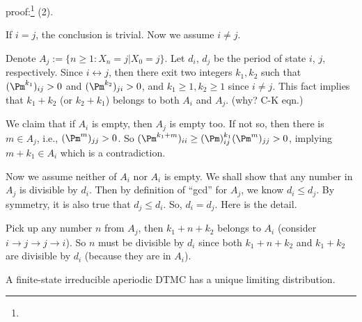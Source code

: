 \documentclass[english,10pt]{beamer}
\begin{document}
\begin{frame}\par
{\small
{proof:}\footnote{{\optional}} (2). 
\biz
\item
If $i=j$, the conclusion is trivial. Now we assume $i\neq j$.

Denote $A_j := \{n\geq 1: X_n=j | X_0=j\}$.
 Let $d_i$, $d_j$ be the period of state $i$, $j$, respectively.
 Since $i \leftrightarrow j $,
then there exit two integers $k_1, k_2$ such that $(\Pm^{k_1})_{ij}>0$
and  $(\Pm^{k_2})_{ji}>0$, and $k_1\geq 1,k_2\geq 1$ since $i\neq j$.
 This fact implies that $k_1+k_2$ (or $k_2+k_1$) belongs to both $A_i$ and $A_j$.
 (why? C-K eqn.)
 
\item  We claim  that if  $A_i$ is empty, then $A_j$ is empty too.
If not so, then there is $m\in A_j$, i.e.,   
  $ (\Pm^m)_{jj}>0$.
 So $(\Pm^{k_1+m})_{ii}\geq (\Pm)^{k_1}_{ij}(\Pm^{m})_{jj}>0$, 
 implying
 $m+k_1\in A_i$ which is a contradiction.
 \item  Now we assume neither of $A_i$ nor $A_i$ is empty.
We shall show that  any number in $A_j$   is divisible by  $d_i$.
Then by definition of ``gcd'' for $A_j$, we know $d_i\leq d_j$.  
By symmetry, it is also true that $d_j\leq d_i$. So, $d_i=d_j$. 
Here is the detail.
\par
Pick up any number $n$ from $A_j$, then   $k_1+n+k_2$   belongs to $A_i$
(consider $i\to j\to j\to i$).  So $n$ must be divisible by $d_i$
since both $k_1+n+k_2$ and $k_1+k_2$ are divisible by $d_i$
(because they are in $A_i$).

\eiz
}
\end{frame}


\begin{frame}
\begin{theorem}
 A finite-state irreducible aperiodic DTMC has a unique limiting distribution.
\end{theorem}



\end{frame}
\end{document}
